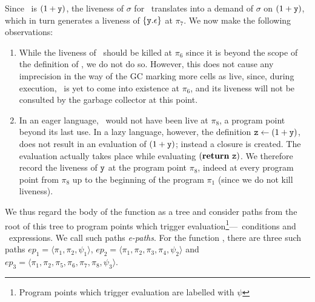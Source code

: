 \documentclass[9pt]{sigplanconf}
\begin{document}
Since   \pz\  is   $(1  +   \mbox{\tt y})$,  the   liveness  of   $\sigma$  for
\pz\ translates into a demand  of $\sigma$ on $(1+\mbox{\tt y})$, which in turn
generates a  liveness of $\{\mbox{\tt y}.\epsilon\}$ at  $\pi_7$.  We now make
the following observations:
\begin{enumerate}
\item While the liveness of \py\  should be killed at $\pi_6$ since it
  is  beyond the scope  of the  definition of  \py, we  do not  do so.
  However, this  does not cause any  imprecision in the way  of the GC
  marking more cells as live,  since, during execution, \py\ is yet to
  come  into  existence at  $\pi_6$,  and  its  liveness will  not  be
  consulted by the garbage collector at this point.
\item In an eager language, \py\ would not have been live at $\pi_8$,
  a program point  beyond its last use.  In  a lazy language, however,
  the  definition $\mbox{\tt z}  \leftarrow  (1+\mbox{\tt y})$, does  not  result in  an
  evaluation  of  $(1+\mbox{\tt y})$;  instead   a  closure  is  created.   The
  evaluation  actually takes  place while  evaluating $(\mbox{$\mathbf{ return}$}~\mbox{\tt z})$.
  We therefore  record  the liveness of $\mbox{\tt y}$ at the program
  point $\pi_8$,  indeed at every  program point from $\pi_8$  up to
  the beginning  of the program $\pi_1$ (since  we do not  kill
liveness).
\end{enumerate}



We thus regard  the body of the function as a  tree and consider paths
from  the  root   of  this  tree  to  program   points  which  trigger
evaluation\footnote{Program   points  which  trigger   evaluation  are
  labelled  with   $\psi$  }---\SIF\ conditions  and \SRETURN\
expressions.   We call such
paths {\em e-paths}.   For the function \length, there  are three such
paths  $ep_1   =  \langle   \pi_1,  \pi_2,  \psi_1\rangle$,   $ep_2  =
\langle\pi_1, \pi_2, \pi_3, \pi_4,  \psi_2\rangle$ and $ep_3 = \langle
\pi_1, \pi_2, \pi_5, \pi_6, \pi_7, \pi_8, \psi_3\rangle$.
\end{document}
